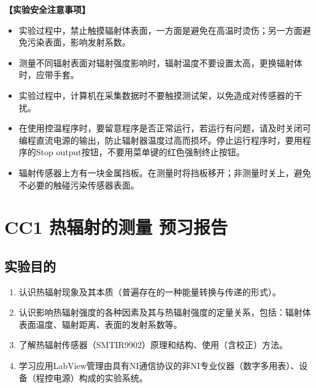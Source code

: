 \documentclass[dvipsnames, svgnames,a4paper,11pt]{article}
\begin{document}
	\textbf{【实验安全注意事项】}	
	\begin{itemize}
		\item 实验过程中，禁止触摸辐射体表面，一方面是避免在高温时烫伤；另一方面避免污染表面，影响发射系数。
		\item 测量不同辐射表面对辐射强度影响时，辐射温度不要设置太高，更换辐射体时，应带手套。
		\item 实验过程中，计算机在采集数据时不要触摸测试架，以免造成对传感器的干扰。
		\item 在使用控温程序时，要留意程序是否正常运行，若运行有问题，请及时关闭可编程直流电源的输出，防止辐射器温度过高而损坏。停止运行程序时，要用程序的Stop output按钮，不要用菜单键的红色强制终止按钮。
		\item 辐射传感器上方有一块金属挡板。在测量时将挡板移开；非测量时关上，避免不必要的触碰污染传感器表面。
	  \end{itemize}
	
	\clearpage
	\tableofcontents
	\clearpage
	
	
	
	
	\setcounter{section}{0}
	\section{CC1 热辐射的测量 \quad\heiti 预习报告}
	
	\subsection{实验目的}
	\begin{enumerate}
	\item 认识热辐射现象及其本质（普遍存在的一种能量转换与传递的形式）。
	\item 认识影响热辐射强度的各种因素及其与热辐射强度的定量关系，包括：辐射体表面温度、辐射距离、表面的发射系数等。
	\item 了解热辐射传感器（SMTIR9902）原理和结构、使用（含校正）方法。
	\item 学习应用LabView管理由具有NI通信协议的非NI专业仪器（数字多用表）、设备（程控电源）构成的实验系统。

	\end{enumerate}
	
\end{document}
